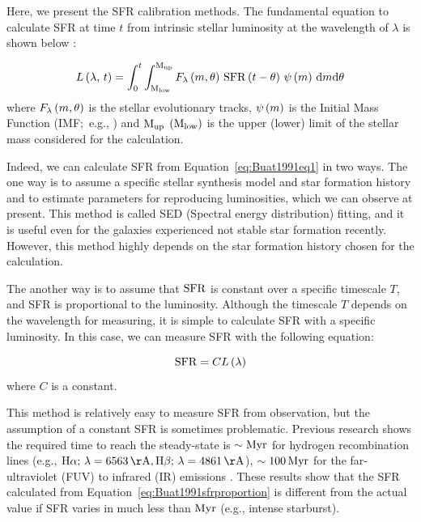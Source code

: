 Here, we present the SFR calibration methods.
The fundamental equation to calculate SFR at time $t$ from intrinsic stellar luminosity at the wavelength of $\lambda$ is shown below \citep{Buat1991}:

\begin{equation}\label{eq:Buat1991eq1}
    L\left(\lambda,\,t\right)=\int_{0}^{t} \int_{\mathrm{M}_{\mathrm{low}}}^{\mathrm{M}_{\mathrm{up}}} F_{\lambda}\left(m, \theta\right)\,\mathrm{SFR}\left(t-\theta\right)\,\psi\left(m\right)\,\mathrm{d}m \mathrm{d} \theta
\end{equation}
where $F_{\lambda}\left(m, \theta\right)$ is the stellar evolutionary tracks, $\psi\left(m\right)$ is the Initial Mass Function (IMF;~e.g., \citealt{Salpeter1955, Kroupa2001, Chabrier2003}) and $\mathrm{M}_{\mathrm{up}}$ $\left(\mathrm{M}_{\mathrm{low}}\right)$ is the upper (lower) limit of the stellar mass considered for the calculation.

Indeed, we can calculate SFR from Equation~\ref{eq:Buat1991eq1} in two ways.
The one way is to assume a specific stellar synthesis model and star formation history and to estimate parameters for reproducing luminosities, which we can observe at present.
This method is called SED (Spectral energy distribution) fitting, and it is useful even for the galaxies experienced not stable star formation recently.
However, this method highly depends on the star formation history chosen for the calculation.

The another way is to assume that $\mathrm{SFR}$ is constant over a specific timescale $T$, and SFR is proportional to the luminosity.
Although the timescale $T$ depends on the wavelength for measuring, it is simple to calculate SFR with a specific luminosity.
In this case, we can measure SFR with the following equation:

\begin{equation}\label{eq:Buat1991sfrproportion}
    \mathrm{SFR} = C L\left(\lambda\right)
\end{equation}
where $C$ is a constant.

This method is relatively easy to measure SFR from observation, but the assumption of a constant SFR is sometimes problematic.
Previous research shows the required time to reach the steady-state is $\sim\mathrm{Myr}$ for hydrogen recombination lines (e.g., $\mr{H\alpha};\,\lambda = 6563\,\mr{\AA}, \mr{H\beta};\,\lambda = 4861\,\mr{\AA}$), $\sim 100\,\mathrm{Myr}$ for the far-ultraviolet (FUV) to infrared (IR) emissions \citep{Hao2011, Murphy2011, Kennicutt2012}.
These results show that the SFR calculated from Equation~\ref{eq:Buat1991sfrproportion} is different from the actual value if SFR varies in much less than $\mathrm{Myr}$ (e.g., intense starburst).

